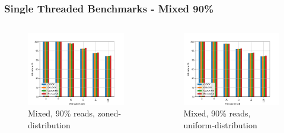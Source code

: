 \documentclass[
	aspectratio=169,
	compress,
]{beamer}
\newcommand{\navframetitle}[1]{\frametitle{#1\hfill{\footnotesize\lastsection{}}}}
\begin{document}
\begin{frame}[fragile]
	\navframetitle{Single Threaded Benchmarks - Mixed 90\%}

	\begin{columns}
		\begin{column}{0.5\textwidth}
			\begin{figure}
        		\includegraphics[width=\textwidth]{rw_90to10_zoned.jpg}
        		\caption{Mixed, 90\% reads, zoned-distribution}
			\end{figure}
		\end{column}
		\begin{column}{0.5\textwidth}
			\begin{figure}[ht]
    			\centering
    			\includegraphics[width=\textwidth]{rw_90to10_uniform.jpg}
        		\caption{Mixed, 90\% reads, uniform-distribution}
			\end{figure}			
		\end{column}
	\end{columns}
\end{frame}
\end{document}
